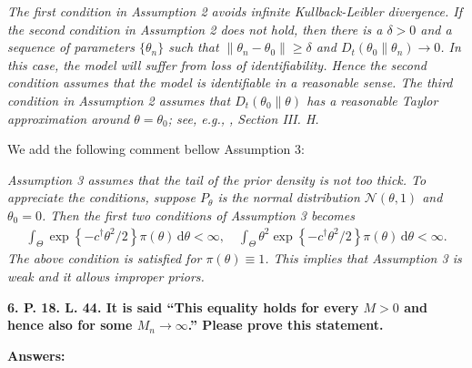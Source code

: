 \documentclass[11pt]{article}
\theoremstyle{plain}
\theoremstyle{definition}
\theoremstyle{remark}
\begin{document}
\begin{adjustwidth}{1.5em}{1.5em}
    \emph{
            The first condition in Assumption 2 avoids infinite Kullback-Leibler divergence.
            If the second condition in Assumption 2 does not hold, then there is a $\delta>0$ and a sequence of parameters             $\{\theta_n\}$ such that $\|\theta_n - \theta_0\| \geq \delta$ and $D_t(\theta_0 \| \theta_n ) \to 0  $.
            In this case, the model will suffer from loss of identifiability.
            Hence the second condition assumes that the model is identifiable in a reasonable sense.
            The third condition in Assumption 2 assumes that $D_t(\theta_0 \| \theta)$ has a reasonable Taylor approximation around    $\theta =\theta_0$; see, e.g., \cite{Erven2014}, Section III. H.
    }
\end{adjustwidth}

We add the following comment bellow Assumption 3:

\begin{adjustwidth}{1.5em}{1.5em}
    \emph{
        Assumption 3 assumes that the tail of the prior density is not too thick.
            To appreciate  the conditions,
            suppose $P_\theta$ is the  normal distribution $ \mathcal N( \theta, 1  )$ and $\theta_0 = 0$.
            Then the first two conditions of Assumption 3 becomes
            \begin{align*}
                    \int_{\Theta} \exp\left\{ -c^\dagger \theta^2 /2 \right\} \pi (\theta) \, \mathrm d \theta < \infty,
                    \quad
                    \int_{\Theta}  \theta^2 \exp\left\{ -c^\dagger \theta^2 /2 \right\} \pi (\theta) \, \mathrm d \theta < \infty.
            \end{align*}
            The above condition is satisfied for $\pi(\theta) \equiv 1$.
            This implies that Assumption 3 is weak and it allows improper priors.
    }
\end{adjustwidth}

\textbf{
6.
P. 18. L. 44.
It is said ``This equality holds for every $M>0$ and hence also for some $M_n \to \infty$.''
Please prove this statement.
}

\textbf{Answers:}
\end{document}
